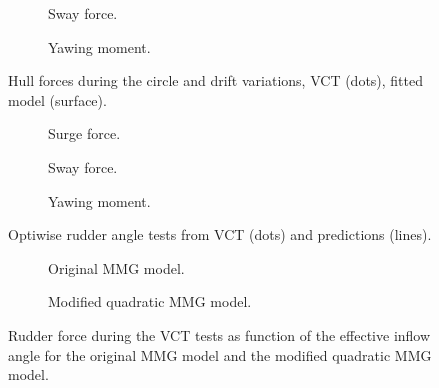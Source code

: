 \begin{figure}[h]
     \centering
     \begin{subfigure}[b]{0.49\textwidth}
         \centering
         
        \caption{Sway force.}
        \label{fig:circle_drift_Y_H}
     \end{subfigure}
     \hfill
     \begin{subfigure}[b]{0.49\textwidth}
         \centering
         
        \caption{Yawing moment.}
        \label{fig:circle_drift_N_H}
     \end{subfigure}
    \caption{Hull forces during the circle and drift variations, VCT (dots), fitted model (surface).}
    \label{fig:circle_drift}
\end{figure}
\begin{figure}[h]
     \centering
     \begin{subfigure}[b]{0.32\textwidth}
         \centering
         
        \caption{Surge force.}
        \label{fig:drift_angle_X}
     \end{subfigure}
     \hfill
     \begin{subfigure}[b]{0.32\textwidth}
         \centering
         
        \caption{Sway force.}
        \label{fig:drift_angle_Y}
     \end{subfigure}
     \hfill
     \begin{subfigure}[b]{0.32\textwidth}
         \centering
         
        \caption{Yawing moment.}
        \label{fig:drift_angle_N}
     \end{subfigure}
    \caption{Optiwise rudder angle tests from VCT (dots) and predictions (lines).}
    \label{fig:drift_angle_wPCC}
\end{figure}
\begin{figure}[h]
     \centering
     \begin{subfigure}[b]{0.49\textwidth}
         \centering
         
        \caption{Original MMG model.}
        \label{fig:circle_drift_Y_H}
     \end{subfigure}
     \hfill
     \begin{subfigure}[b]{0.49\textwidth}
         \centering
         
        \caption{Modified quadratic MMG model.}
        \label{fig:circle_drift_N_H}
     \end{subfigure}
    \caption{Rudder force during the VCT tests as function of the effective inflow angle for the original MMG model and the modified quadratic MMG model.}
    \label{fig:circle_drift}
\end{figure}
